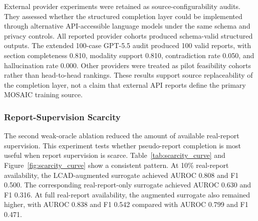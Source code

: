 \documentclass[11pt, a4paper]{article}
\theoremstyle{plain}
\theoremstyle{definition}
\begin{document}
External provider experiments were retained as source-configurability audits. They assessed whether the structured completion layer could be implemented through alternative API-accessible language models under the same schema and privacy controls. All reported provider cohorts produced schema-valid structured outputs. The extended 100-case GPT-5.5 audit produced 100 valid reports, with section completeness 0.810, modality support 0.810, contradiction rate 0.050, and hallucination rate 0.000. Other providers were treated as pilot feasibility cohorts rather than head-to-head rankings. These results support source replaceability of the completion layer, not a claim that external API reports define the primary MOSAIC training source.

\subsubsection{Report-Supervision Scarcity}
\label{subsec:scarcity_results}

The second weak-oracle ablation reduced the amount of available real-report supervision. This experiment tests whether pseudo-report completion is most useful when report supervision is scarce. Table~\ref{tab:scarcity_curve} and Figure~\ref{fig:scarcity_curve} show a consistent pattern. At 10\% real-report availability, the LCAD-augmented surrogate achieved AUROC 0.808 and F1 0.500. The corresponding real-report-only surrogate achieved AUROC 0.630 and F1 0.316. At full real-report availability, the augmented surrogate also remained higher, with AUROC 0.838 and F1 0.542 compared with AUROC 0.799 and F1 0.471.
\end{document}
